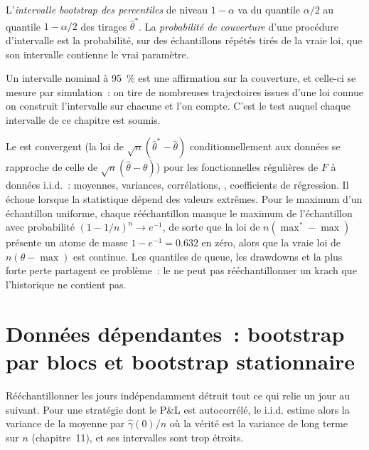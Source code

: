 \begin{definition}\label{def:qm:resampling:interval}
L'\emph{intervalle bootstrap des percentiles} de niveau $1 - \alpha$ va du quantile $\alpha/2$ au quantile $1 -
\alpha/2$ des tirages  $\hat\theta^*$. La \emph{probabilité de couverture} d'une procédure d'intervalle
est la probabilité, sur des échantillons répétés tirés de la vraie loi, que son intervalle contienne le vrai paramètre.
\end{definition}

Un intervalle nominal à 95~\% est une affirmation sur la couverture, et celle-ci se mesure par simulation~: on tire de nombreuses trajectoires issues d'une loi connue
on construit l'intervalle sur chacune et l'on compte. C'est le test auquel chaque intervalle de ce chapitre est soumis.

Le  est convergent (la loi de $\sqrt n(\hat\theta^* - \hat\theta)$ conditionnellement aux données se rapproche de celle de $\sqrt n(\hat\theta -
\theta)$) pour les fonctionnelles régulières de $F$ à données i.i.d.~: moyennes, variances, corrélations, , coefficients de régression. Il échoue
lorsque la statistique dépend des valeurs extrêmes. Pour le maximum d'un échantillon uniforme, chaque rééchantillon manque le maximum de l'échantillon avec
probabilité $(1 - 1/n)^n \to e^{-1}$, de sorte que la loi  de $n(\max^* - \max)$ présente un atome de masse $1 - e^{-1} = 0.632$ en zéro,
alors que la vraie loi de $n(\theta - \max)$ est continue. Les quantiles de queue, les drawdowns et la plus forte perte partagent ce problème~: le
 ne peut pas rééchantillonner un krach que l'historique ne contient pas.

\section{Données dépendantes~: bootstrap par blocs et bootstrap stationnaire}

Rééchantillonner les jours indépendamment détruit tout ce qui relie un jour au suivant. Pour une stratégie dont le P\&L est autocorrélé, le
 i.i.d. estime alors la variance de la moyenne par $\hat\gamma(0)/n$ où la vérité est la variance de long terme sur $n$
(chapitre~11), et ses intervalles sont trop étroits.

